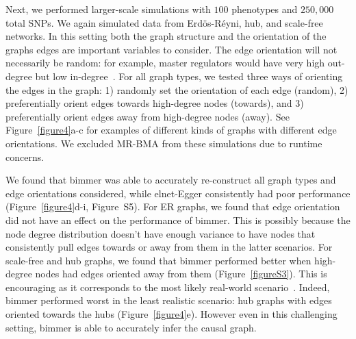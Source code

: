 \documentclass{article}
\begin{document}
Next, we performed larger-scale simulations with $100$ phenotypes and
$250,000$ total SNPs. We again
simulated data from Erd\"os-R\'eyni, hub, and scale-free networks. In this setting
both the graph structure and the orientation of the graphs edges are important
variables to consider. The edge orientation will not necessarily be random:
for example, master regulators would have very high out-degree but low in-degree~\cite{Liu2010}.
For all graph types, we tested three ways of orienting the edges in the graph:
 1) randomly set the orientation
of each edge (random), 2) preferentially orient edges towards high-degree nodes (towards),
 and 3) preferentially orient edges away from high-degree nodes (away). See
 Figure~\ref{figure4}a-c for examples of different kinds of graphs with
 different edge orientations. We excluded
MR-BMA from these simulations due to runtime concerns.

We found that bimmer was able to accurately re-construct all graph types and edge
orientations considered, while
elnet-Egger consistently had poor performance (Figure~\ref{figure4}d-i, Figure~S5).
 For ER graphs, we found that edge orientation did not have an effect on the
 performance of bimmer. This is possibly because the node degree distribution
 doesn't have enough variance to have nodes that consistently pull edges towards
 or away from them in the latter scenarios. For scale-free and hub graphs, we
 found that bimmer performed better when high-degree nodes had edges oriented
 away from them (Figure~\ref{figureS3}). This is encouraging as
 it corresponds to the most likely real-world scenario~\cite{Barabasi1999}. Indeed, bimmer
 performed worst in the least realistic scenario: hub graphs with edges oriented
 towards the hubs (Figure~\ref{figure4}e). However even in this challenging setting, bimmer
 is able to accurately infer the causal graph.
\end{document}
